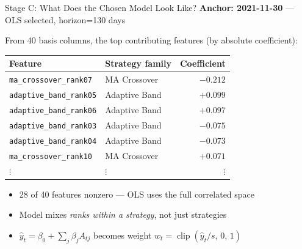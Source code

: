 \documentclass[aspectratio=169]{beamer}
\begin{document}
\begin{frame}{Stage C: What Does the Chosen Model Look Like?}
  \textbf{Anchor: 2021-11-30} — OLS selected, horizon=130 days

  \vspace{0.3em}
  From 40 basis columns, the top contributing features (by absolute coefficient):

  \vspace{0.3em}
  \small
  \begin{tabular}{llr}
    \toprule
    Feature & Strategy family & Coefficient \\
    \midrule
    \texttt{ma\_crossover\_rank07}       & MA Crossover   & $-0.212$ \\
    \texttt{adaptive\_band\_rank05}      & Adaptive Band  & $+0.099$ \\
    \texttt{adaptive\_band\_rank06}      & Adaptive Band  & $+0.097$ \\
    \texttt{adaptive\_band\_rank03}      & Adaptive Band  & $-0.075$ \\
    \texttt{adaptive\_band\_rank04}      & Adaptive Band  & $-0.073$ \\
    \texttt{ma\_crossover\_rank10}       & MA Crossover   & $+0.071$ \\
    $\vdots$ & $\vdots$ & $\vdots$ \\
    \bottomrule
  \end{tabular}

  \normalsize
  \vspace{0.4em}
  \begin{itemize}
    \item 28 of 40 features nonzero — OLS uses the full correlated space
    \item Model mixes \emph{ranks within a strategy}, not just strategies
    \item \(\hat{y}_t = \beta_0 + \sum_j \beta_j A_{tj}\) becomes weight \(w_t = \operatorname{clip}(\hat{y}_t/s,\,0,\,1)\)
  \end{itemize}
\end{frame}
\end{document}
